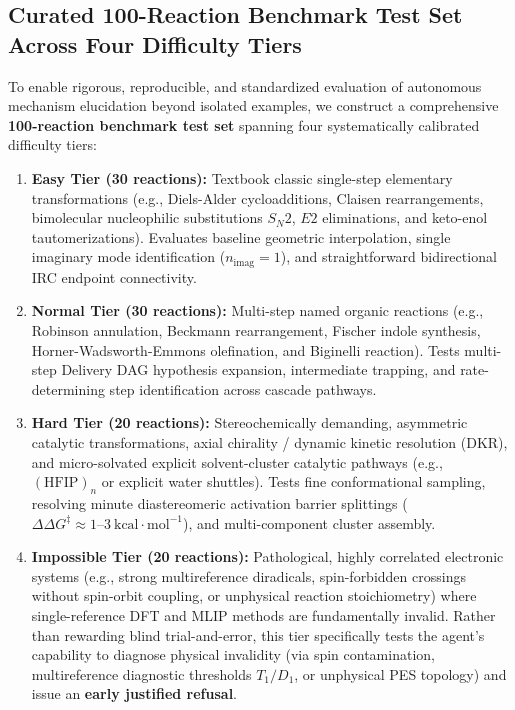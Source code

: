 \documentclass[10pt,twocolumn,letterpaper]{article}
\begin{document}
\subsection{Curated 100-Reaction Benchmark Test Set Across Four Difficulty Tiers}
To enable rigorous, reproducible, and standardized evaluation of autonomous mechanism elucidation beyond isolated examples, we construct a comprehensive \textbf{100-reaction benchmark test set} spanning four systematically calibrated difficulty tiers:
\begin{enumerate}[leftmargin=*]
\item \textbf{Easy Tier (30 reactions):} Textbook classic single-step elementary transformations (e.g., Diels-Alder cycloadditions, Claisen rearrangements, bimolecular nucleophilic substitutions $S_N2$, $E2$ eliminations, and keto-enol tautomerizations). Evaluates baseline geometric interpolation, single imaginary mode identification ($n_\mathrm{imag}=1$), and straightforward bidirectional IRC endpoint connectivity.
\item \textbf{Normal Tier (30 reactions):} Multi-step named organic reactions (e.g., Robinson annulation, Beckmann rearrangement, Fischer indole synthesis, Horner-Wadsworth-Emmons olefination, and Biginelli reaction). Tests multi-step Delivery DAG hypothesis expansion, intermediate trapping, and rate-determining step identification across cascade pathways.
\item \textbf{Hard Tier (20 reactions):} Stereochemically demanding, asymmetric catalytic transformations, axial chirality / dynamic kinetic resolution (DKR), and micro-solvated explicit solvent-cluster catalytic pathways (e.g., $(\mathrm{HFIP})_n$ or explicit water shuttles). Tests fine conformational sampling, resolving minute diastereomeric activation barrier splittings ($\Delta\Delta G^\ddagger \approx 1\text{--}3\ \mathrm{kcal\cdot mol^{-1}}$), and multi-component cluster assembly.
\item \textbf{Impossible Tier (20 reactions):} Pathological, highly correlated electronic systems (e.g., strong multireference diradicals, spin-forbidden crossings without spin-orbit coupling, or unphysical reaction stoichiometry) where single-reference DFT and MLIP methods are fundamentally invalid. 
Rather than rewarding blind trial-and-error, this tier specifically tests the agent's capability to diagnose physical invalidity (via spin contamination, multireference diagnostic thresholds $T_1/D_1$, or unphysical PES topology) and issue an \textbf{early justified refusal}.
\end{enumerate}
\end{document}
